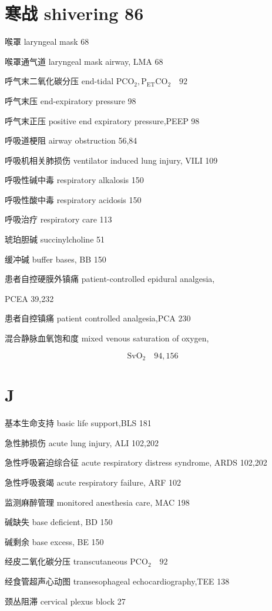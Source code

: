 \documentclass[10pt]{article}
\begin{document}
\section*{寒战 shivering 86}
喉罩 laryngeal mask 68

喉罩通气道 laryngeal mask airway, LMA 68

呼气末二氧化碳分压 end-tidal $\mathrm{PCO}_{2}, \mathrm{P}_{\mathrm{ET}} \mathrm{CO}_{2} \quad 92$

呼气末压 end-expiratory pressure 98

呼气末正压 positive end expiratory pressure,PEEP 98

呼吸道梗阻 airway obstruction 56,84

呼吸机相关肺损伤 ventilator induced lung injury, VILI 109

呼吸性碱中毒 respiratory alkalosis 150

呼吸性酸中毒 respiratory acidosis 150

呼吸治疗 respiratory care 113

琥珀胆碱 succinylcholine 51

缓冲碱 buffer bases, BB 150

患者自控硬膜外镇痛 patient-controlled epidural analgesia,

PCEA 39,232

患者自控镇痛 patient controlled analgesia,PCA 230

混合静脉血氧饱和度 mixed venous saturation of oxygen,

\[
\mathrm{SvO}_{2} \quad 94,156
\]

\section*{J}
基本生命支持 basic life support,BLS 181

急性肺损伤 acute lung injury, ALI 102,202

急性呼吸窘迫综合征 acute respiratory distress syndrome, ARDS 102,202

急性呼吸衰竭 acute respiratory failure, ARF 102

监测麻醉管理 monitored anesthesia care, MAC 198

碱缺失 base deficient, BD 150

碱剩余 base excess, BE 150

经皮二氧化碳分压 transcutaneous $\mathrm{PCO}_{2} \quad 92$

经食管超声心动图 transesophageal echocardiography,TEE 138

颈丛阻滞 cervical plexus block 27
\end{document}
